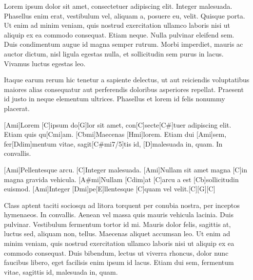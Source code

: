 

Lorem ipsum dolor sit amet, consectetuer adipiscing elit. Integer malesuada.
Phasellus enim erat, vestibulum vel, aliquam a, posuere eu, velit. Quisque porta.
Ut enim ad minim veniam, quis nostrud exercitation ullamco laboris 
nisi ut aliquip ex ea commodo consequat. Etiam neque. Nulla pulvinar eleifend sem. 
Duis condimentum augue id magna semper rutrum. Morbi imperdiet, mauris ac auctor 
dictum, nisl ligula egestas nulla, et sollicitudin sem purus in lacus. Vivamus 
luctus egestas leo.

Itaque earum rerum hic tenetur a sapiente delectus, ut aut reiciendis voluptatibus 
maiores alias consequatur aut perferendis doloribus asperiores repellat. Praesent 
id justo in neque elementum ultrices. Phasellus et lorem id felis nonummy placerat.

\guitarOn
\strophe{}[Ami]Lorem [C]ipsum do[G]lor sit amet,
con[C]secte[C#]tuer adipiscing elit.
Etiam quis qu[Cmi]am. [Cbmi]Maecenas [Hmi]lorem.
Etiam dui [Ami]sem, fer[Ddim]mentum vitae,
sagit[C#mi7/5]tis id, [D]malesuada in, quam. In convallis.

[Ami]Pellentesque arcu. [C]Integer malesuada.
[Ami]Nullam sit amet magna [C]in magna gravida vehicula.
[A#mi]Nullam [Cdim]at [C]arcu a est [Cb]sollicitudin euismod.
[Ami]Integer [Dmi]pe[E]llentesque [C]quam vel velit.[C][G][C]
\guitarOff

Class aptent taciti sociosqu ad litora torquent per conubia nostra, per inceptos 
hymenaeos. In convallis. Aenean vel massa quis mauris vehicula lacinia. Duis 
pulvinar. Vestibulum fermentum tortor id mi. Mauris dolor felis, sagittis at, 
luctus sed, aliquam non, tellus. Maecenas aliquet accumsan leo. Ut enim ad minim 
veniam, quis nostrud exercitation ullamco laboris nisi ut aliquip ex ea commodo 
consequat. Duis bibendum, lectus ut viverra rhoncus, dolor nunc faucibus libero, 
eget facilisis enim ipsum id lacus. Etiam dui sem, fermentum vitae, sagittis id, 
malesuada in, quam. 

\bye
